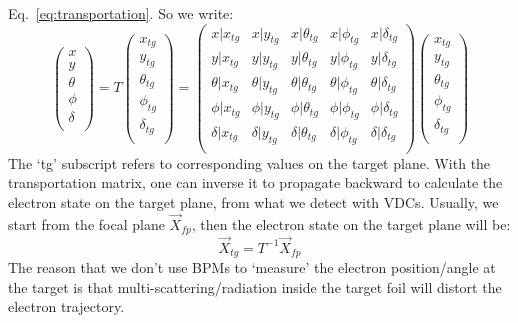 Eq.~\ref{eq:transportation}. So we write:
\begin{equation}
    \begin{pmatrix}
	x   \\
	y   \\
	\theta	\\
	\phi	\\
	\delta	\\
    \end{pmatrix}
    =
    T
    \begin{pmatrix}
	x_{tg}   \\
	y_{tg}   \\
	\theta_{tg}	\\
	\phi_{tg}	\\
	\delta_{tg}	\\
    \end{pmatrix}
    =
    \begin{pmatrix}
	x|x_{tg} & x|y_{tg}   & x|\theta_{tg}	& x|\phi_{tg}    & x|\delta_{tg}    \\
	y|x_{tg} & y|y_{tg}   & y|\theta_{tg}	& y|\phi_{tg}    & y|\delta_{tg}    \\
	\theta|x_{tg} & \theta|y_{tg}   & \theta|\theta_{tg}	& \theta|\phi_{tg}    & \theta|\delta_{tg}    \\
	\phi|x_{tg} & \phi|y_{tg}   & \phi|\theta_{tg}	& \phi|\phi_{tg}    & \phi|\delta_{tg}    \\
	\delta|x_{tg} & \delta|y_{tg}   & \delta|\theta_{tg}	& \delta|\phi_{tg}    & \delta|\delta_{tg}    \\
    \end{pmatrix}
    \begin{pmatrix}
	x_{tg}   \\
	y_{tg}   \\
	\theta_{tg}	\\
	\phi_{tg}	\\
	\delta_{tg}	\\
    \end{pmatrix}
\end{equation}
The `tg' subscript refers to corresponding values on the target plane. 
With the transportation matrix, one can inverse it to propagate backward 
to calculate the electron state on the target plane, 
from what we detect with VDCs. Usually, we start from the focal plane $\vec{X}_{fp}$, 
then the electron state on the target plane will be: 
\begin{equation}
    \vec{X}_{tg} = T^{-1} \vec{X}_{fp}
    \label{eq:reconstruction}
\end{equation}
The reason that we don't use BPMs to `measure' the electron position/angle at 
the target is that multi-scattering/radiation inside the target foil will 
distort the electron trajectory. 

